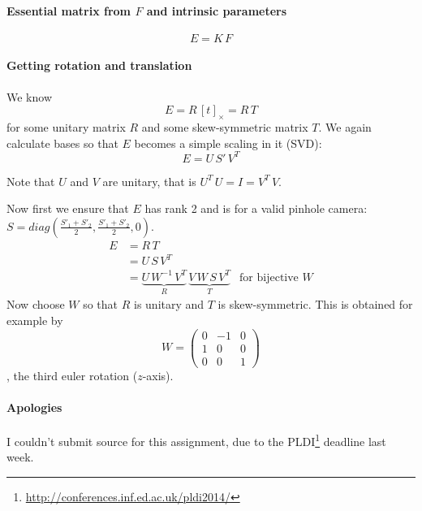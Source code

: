 \documentclass{paper}
\begin{document}
\paragraph{Essential matrix from $F$ and intrinsic parameters}
\[E = K\, F\]
\paragraph{Getting rotation and translation}
We know
\[ E = R\,[t]_\times = R\, T\]
for some unitary matrix $R$ and some skew-symmetric matrix $T$. We again 
calculate bases so that $E$ becomes a simple scaling in it (SVD):
\[ E = U \, S'\, V^T\]

Note that $U$ and $V$ are unitary, that is $U^T\,U = I = V^T\, V$.

Now first we ensure that $E$ has rank 2 and is for a valid pinhole camera:
$S = diag(\frac{S'_1 +S'_2}{2}, \frac{S'_1 +S'_2}{2}, 0)$.
\begin{align*}
	E 	&=  R\, T \\
	 	&= U\, S\, V^T\\
	 	&= \underbrace{U\, W^{-1}\, V^T}_{R}\, \underbrace{V\, W\, S\, V^T}_{T} &\text{for bijective } W
\end{align*}
Now choose $W$ so that $R$ is unitary and $T$ is skew-symmetric. This is obtained for example by
\[ W =\begin{pmatrix}
0 & -1 &0\\
1& 0&0\\
0&0&1
\end{pmatrix} \]
, the third euler rotation ($z$-axis).

\paragraph{Apologies}
I couldn't submit source for this assignment, due to the PLDI\footnote{\url{http://conferences.inf.ed.ac.uk/pldi2014/}} deadline last week.
\end{document}
